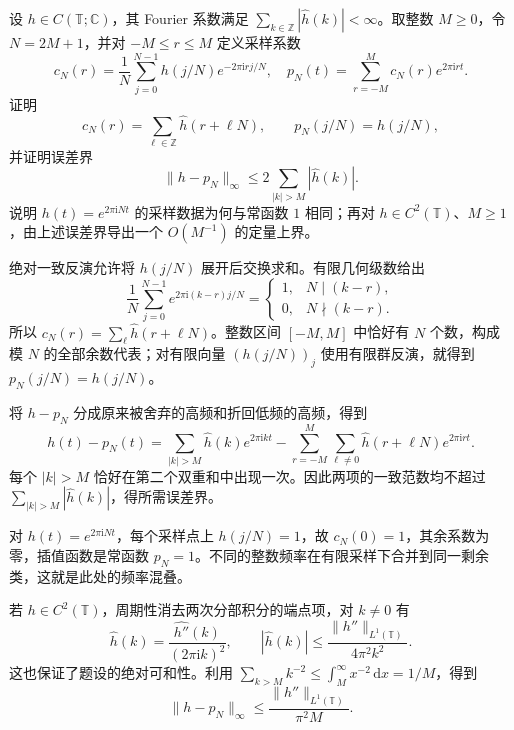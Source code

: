 \begin{exercise}[周期采样与频率混叠]\label{b2:ex:I4-sampling-aliasing}
设 \(h\in C(\mathbb T;\mathbb C)\)，其 Fourier 系数满足
\(\sum_{k\in\mathbb Z}|\widehat h(k)|<\infty\)。取整数 \(M\ge0\)，令 \(N=2M+1\)，并对 \(-M\le r\le M\) 定义采样系数
\[
 c_N(r)=\frac1N\sum_{j=0}^{N-1}h(j/N)e^{-2\pi\mathrm i rj/N},
 \quad
 p_N(t)=\sum_{r=-M}^Mc_N(r)e^{2\pi\mathrm i rt}.
\]
证明
\[
 c_N(r)=\sum_{\ell\in\mathbb Z}\widehat h(r+\ell N),
 \qquad p_N(j/N)=h(j/N),
\]
并证明误差界
\[
 \|h-p_N\|_\infty\le2\sum_{|k|>M}|\widehat h(k)|.
\]
说明 \(h(t)=e^{2\pi\mathrm i Nt}\) 的采样数据为何与常函数 \(1\) 相同；再对 \(h\in C^2(\mathbb T)\)、\(M\ge1\)，由上述误差界导出一个 \(O(M^{-1})\) 的定量上界。
\end{exercise}
\begin{solution}
绝对一致反演允许将 \(h(j/N)\) 展开后交换求和。有限几何级数给出
\[
 \frac1N\sum_{j=0}^{N-1}e^{2\pi\mathrm i(k-r)j/N}
 =\begin{cases}1,&N\mid(k-r),\\0,&N\nmid(k-r).\end{cases}
\]
所以 \(c_N(r)=\sum_\ell\widehat h(r+\ell N)\)。整数区间 \([-M,M]\) 中恰好有 \(N\) 个数，构成模 \(N\) 的全部余数代表；对有限向量 \((h(j/N))_j\) 使用有限群反演，就得到 \(p_N(j/N)=h(j/N)\)。

将 \(h-p_N\) 分成原来被舍弃的高频和折回低频的高频，得到
\[
 h(t)-p_N(t)
 =\sum_{|k|>M}\widehat h(k)e^{2\pi\mathrm i kt}
 -\sum_{r=-M}^M\sum_{\ell\ne0}
       \widehat h(r+\ell N)e^{2\pi\mathrm i rt}.
\]
每个 \(|k|>M\) 恰好在第二个双重和中出现一次。因此两项的一致范数均不超过 \(\sum_{|k|>M}|\widehat h(k)|\)，得所需误差界。

对 \(h(t)=e^{2\pi\mathrm i Nt}\)，每个采样点上 \(h(j/N)=1\)，故 \(c_N(0)=1\)，其余系数为零，插值函数是常函数 \(p_N=1\)。不同的整数频率在有限采样下合并到同一剩余类，这就是此处的频率混叠。

若 \(h\in C^2(\mathbb T)\)，周期性消去两次分部积分的端点项，对 \(k\ne0\) 有
\[
 \widehat h(k)=\frac{\widehat{h''}(k)}{(2\pi\mathrm i k)^2},
 \qquad |\widehat h(k)|\le\frac{\|h''\|_{L^1(\mathbb T)}}{4\pi^2k^2}.
\]
这也保证了题设的绝对可和性。利用 \(\sum_{k>M}k^{-2}\le\int_M^\infty x^{-2}\,\mathrm dx=1/M\)，得到
\[
 \|h-p_N\|_\infty
 \le\frac{\|h''\|_{L^1(\mathbb T)}}{\pi^2 M}.
\]
\end{solution}


